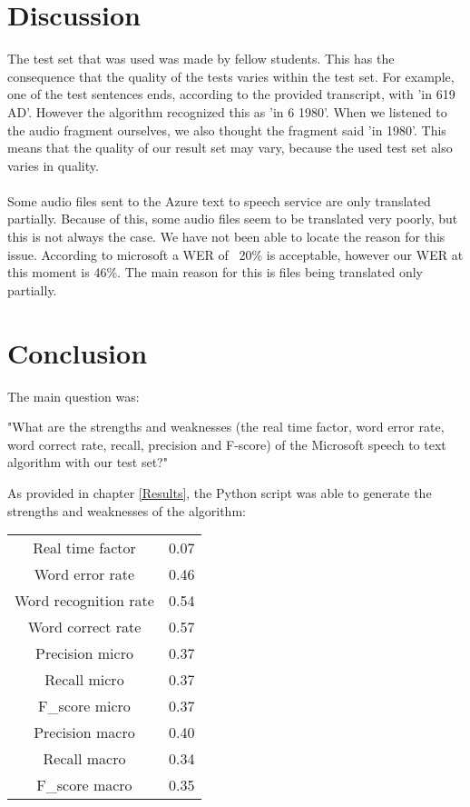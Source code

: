 \documentclass{article}
\begin{document}
\section{Discussion}
The test set that was used was made by fellow students. This has the consequence that the quality of the tests varies within the test set. For example, one of the test sentences ends, according to the provided transcript, with 'in 619 AD'. However the algorithm recognized this as 'in 6 1980'. When we listened to the audio fragment ourselves, we also thought the fragment said 'in 1980'. This means that the quality of our result set may vary, because the used test set also varies in quality. \\ \\
Some audio files sent to the Azure text to speech service are only translated partially. Because of this, some audio files seem to be translated very poorly, but this is not always the case. We have not been able to locate the reason for this issue. According to microsoft\cite{MicrosoftAzure} a WER of ~20\% is acceptable, however our WER at this moment is 46\%. The main reason for this is files being translated only partially.

\section{Conclusion}
The main question was:
\begin{center}
    "What are the strengths and weaknesses (the real time factor, word error rate, word correct rate, recall, precision and F-score) of the Microsoft speech to text algorithm with our test set?" \\
\end{center}
As provided in chapter \ref{Results}, the Python script was able to generate the strengths and weaknesses of the algorithm:
\begin{center}
\begin{tabular}{ |c|c| } 
 \hline
 Real time factor & 0.07 \\ 
 Word error rate & 0.46 \\ 
 Word recognition rate & 0.54 \\ 
 Word correct rate & 0.57 \\ 
 Precision micro & 0.37 \\ 
 Recall micro & 0.37 \\ 
 F\_score micro & 0.37 \\  
 Precision macro & 0.40 \\  
 Recall macro & 0.34 \\  
 F\_score macro & 0.35 \\   
 \hline
\end{tabular}
\end{center}
\end{document}

